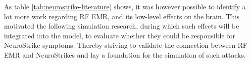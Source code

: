     As table \ref{tab:neurostrike-literature} shows, it was however possible to identify a lot more work regarding RF EMR, and its low-level effects on the brain. This motivated the following simulation research, during which such effects will be integrated into the model, to evaluate whether they could be responsible for NeuroStrike symptoms. Thereby striving to validate the connection between RF EMR and NeuroStrikes and lay a foundation for the simulation of such attacks.

    
    
